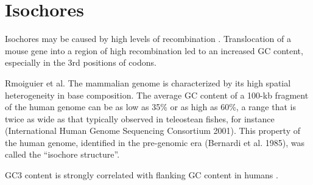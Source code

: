 \section{Isochores}

Isochores may be caused by high levels of recombination
\cite{montoya2003recombination}. Translocation of a mouse gene into a region of
high recombination led to an increased GC content, especially in the 3rd
positions of codons.

\begin{aquote}{Rmoiguier et al. \cite{romiguier2010contrasting}}
  The mammalian genome is characterized by its high spatial heterogeneity in base
  composition. The average GC content of a 100-kb fragment of the human genome
  can be as low as 35\% or as high as 60\%, a range that is twice as wide as
  that typically observed in teleostean fishes, for instance (International
  Human Genome Sequencing Consortium 2001). This property of the human genome,
  identified in the pre-genomic era (Bernardi et al. 1985), was called the
  ``isochore structure''.
\end{aquote}

GC3 content is strongly correlated with flanking GC content in humans
\cite{mouchiroud1988compositional}.
